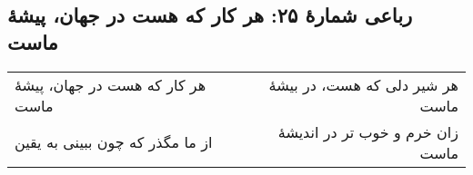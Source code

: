 \begin{center}
\section*{رباعی شمارهٔ ۲۵: هر کار که هست در جهان، پیشۀ ماست}
\label{sec:025}
\begin{longtable}{l p{0.5cm} r}
هر کار که هست در جهان، پیشهٔ ماست
&&
هر شیر دلی که هست، در بیشهٔ ماست
\\
از ما مگذر که چون ببینی به یقین 
&&
زان خرم و خوب تر در اندیشهٔ ماست
\\
\end{longtable}
\end{center}
